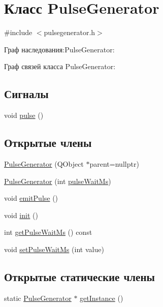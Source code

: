 \hypertarget{class_pulse_generator}{}\section{Класс Pulse\+Generator}
\label{class_pulse_generator}


{\ttfamily \#include $<$pulsegenerator.\+h$>$}



Граф наследования\+:Pulse\+Generator\+:


Граф связей класса Pulse\+Generator\+:
\subsection*{Сигналы}
\begin{DoxyCompactItemize}
\item 
void \hyperlink{class_pulse_generator_a9cba97e580401ccf955c6420670d8a57}{pulse} ()
\end{DoxyCompactItemize}
\subsection*{Открытые члены}
\begin{DoxyCompactItemize}
\item 
\hyperlink{class_pulse_generator_aff7b38fa92c5f1181cbeca42c62c7b21}{Pulse\+Generator} (Q\+Object $\ast$parent=nullptr)
\item 
\hyperlink{class_pulse_generator_a7111507b8d68fa6b44b1dfa721f3803f}{Pulse\+Generator} (int \hyperlink{class_pulse_generator_a18f67c580cb5e9acc3e53f8fdb828128}{pulse\+Wait\+Ms})
\item 
void \hyperlink{class_pulse_generator_afb3edba196d7c85b08b7b4afc7d4956c}{emit\+Pulse} ()
\item 
void \hyperlink{class_pulse_generator_a02a345a74696d6e1951ddff50c9208dc}{init} ()
\item 
int \hyperlink{class_pulse_generator_a22da8e28f2e7621b1d87a92eaf527bba}{get\+Pulse\+Wait\+Ms} () const
\item 
void \hyperlink{class_pulse_generator_a1ab5f10bb78d277d4e04a120f13908b6}{set\+Pulse\+Wait\+Ms} (int value)
\end{DoxyCompactItemize}
\subsection*{Открытые статические члены}
\begin{DoxyCompactItemize}
\item 
static \hyperlink{class_pulse_generator}{Pulse\+Generator} $\ast$ \hyperlink{class_pulse_generator_ace9e6e44b3fcd3103b65805d44261ced}{get\+Instance} ()
\end{DoxyCompactItemize}
